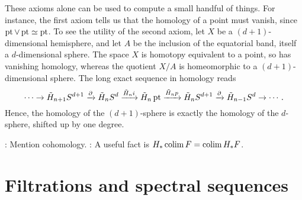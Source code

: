 These axioms alone can be used to compute a small handful of things.  For instance, the first axiom tells us that the homology of a point must vanish, since $\operatorname{pt} \vee \operatorname{pt} \simeq \operatorname{pt}$.  To see the utility of the second axiom, let $X$ be a $(d+1)$-dimensional hemisphere, and let $A$ be the inclusion of the equatorial band, itself a $d$-dimensional sphere.  The space $X$ is homotopy equivalent to a point, so has vanishing homology, whereas the quotient $X / A$ is homeomorphic to a $(d+1)$-dimensional sphere.  The long exact sequence in homology reads \[\cdots \to \tilde H_{n+1} S^{d+1} \xrightarrow{\partial} \tilde H_n S^d \xrightarrow{\tilde H_n i} \tilde H_n \operatorname{pt} \xrightarrow{\tilde H_n p} \tilde H_n S^{d+1} \xrightarrow{\partial} \tilde H_{n-1} S^d \to \cdots.\]  Hence, the homology of the $(d+1)$-sphere is exactly the homology of the $d$-sphere, shifted up by one degree.

\TODO: Mention cohomology.
\TODO: A useful fact is $H_* \operatorname{colim} F = \operatorname{colim} H_* F$.

\section{Filtrations and spectral sequences}

